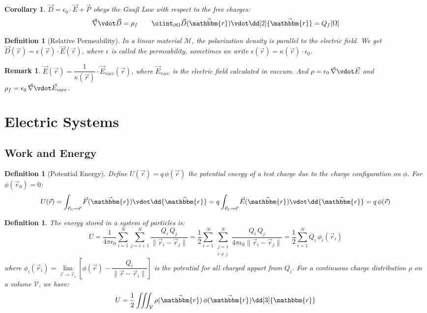 \documentclass[12pt]{article}
\renewcommand{\div}{\vec{\nabla}\vdot}
\newcommand*{\rv}{\vec{r}}
\newcommand*{\vF}{\vec{F}}
\newcommand*{\ir}{\mathbbm{r}}
\newcommand*{\irv}{\vec{\mathbbm{r}}}
\newcommand*{\vE}{\vec{E}}
\newcommand*{\ee}{\epsilon_0}
\newcommand*{\vol}{\mathcal{V}}
\newcommand*{\mat}{\mathcal{M}}
\newtheorem{definition}[theorem]{Definition}
\newtheorem{corollary}[theorem]{Corollary}
\newtheorem{remark}[theorem]{Remark}
\begin{document}
\begin{corollary}
  $\vec{D}=\ee\cdot\vec{E}+\vec{P}$ obeys the Gauß Law with respect to the free charges:
  $$\div\vec{D}=\rho_f\qquad\oiint_{\partial\Omega}\vec{D}(\irv)\vdot\dd[2]{\irv}=Q_f[\Omega]$$
\end{corollary}

\begin{definition}[Relative Permeability]
  In a linear material $\mat$, the polarization density is parallel to the electric field. We get $\vec{D}(\rv)=\epsilon(\rv)\cdot \vE(\rv)$, where $\epsilon$ is called the permeability, sometimes we write $\epsilon(\rv)=\kappa(\rv)\cdot \ee$.
\end{definition}

\begin{remark}
  $\vE(\rv)=\dfrac{1}{\kappa(\rv)}\cdot\vE_\text{vacc}(\rv)$, where $\vE_\text{vacc}$ is the electric field calculated in vaccum. And $\rho=\ee\,\div\vE$ and $\rho_f=\ee\,\div\vE_\text{vacc}$.
\end{remark}

\pagebreak

\section{Electric Systems}

\subsection{Work and Energy}

\begin{definition}[Potential Energy]
  Define $U(\rv)=q\,\phi(\rv)$ the potential energy of a test charge due to the charge configuration on $\phi$. For $\phi(\rv_0)=0$: $$U(\rv)=\int_{\rv_0\to\rv}\vF(\irv)\vdot\dd{\irv}=q\int_{\rv_0\to\rv}\vE(\irv)\vdot\dd{\irv}=q\,\phi(\rv)$$
\end{definition}

\begin{definition}
  \label{el_energy_stored}
  The energy stored in a system of particles is: $$U=\frac{1}{4\pi\ee}\sum_{i=1}^N\sum_{j =i+1}^N\frac{Q_i\,Q_j}{\|\rv_i-\rv_j\|}=\frac{1}{2}\sum_{i=1}^N\sum_{\substack{j =1\\i\neq j}}^N\frac{Q_i\,Q_j}{4\pi\ee\|\rv_i-\rv_j\|}=\frac{1}{2}\sum_{i=1}^N Q_i\,\phi_i(\rv_i)$$ where $\phi_i(\rv_i)=\lim\limits_{\rv\to\rv_i}\left[\phi(\rv)-\dfrac{Q_i}{\|\rv-\rv_i\|}\right]$ is the potential for all charged appart from $Q_i$. For a continuous charge distribution $\rho$ on a volume $\vol$, we have:
  $$U=\frac{1}{2}\iiint_\vol \rho(\irv)\,\phi(\irv)\dd[3]{\ir}$$
\end{definition}
\end{document}
